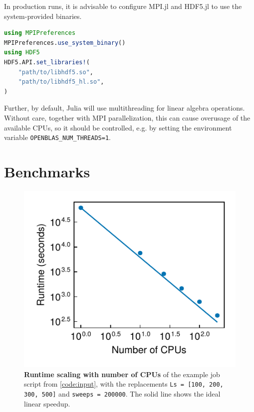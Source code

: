 \documentclass{SciPost}
\begin{document}
In production runs, it is advisable to configure MPI.jl and HDF5.jl to use the system-provided binaries.
\begin{lstlisting}[language=julia]
using MPIPreferences
MPIPreferences.use_system_binary()
using HDF5
HDF5.API.set_libraries!(
    "path/to/libhdf5.so",
    "path/to/libhdf5_hl.so",
)
\end{lstlisting}
Further, by default, Julia will use multithreading for linear algebra operations. Without care, together with MPI parallelization, this can cause overusage of the available CPUs, so 
it should be controlled, e.g. by setting the environment variable \texttt{OPENBLAS\_{}NUM\_{}THREADS=1}.
 
\section{Benchmarks}
\begin{figure}
\begin{center}
\includegraphics{figs/scaling.pdf}
\end{center}
\caption{\textbf{Runtime scaling with number of CPUs} of the example job script from \cref{code:input}, with the replacements \texttt{Ls = [100, 200, 300, 500]} and \texttt{sweeps = 200000}. The solid line shows the ideal linear speedup.}
\label{fig:benchmark}
\end{figure}
\end{document}
